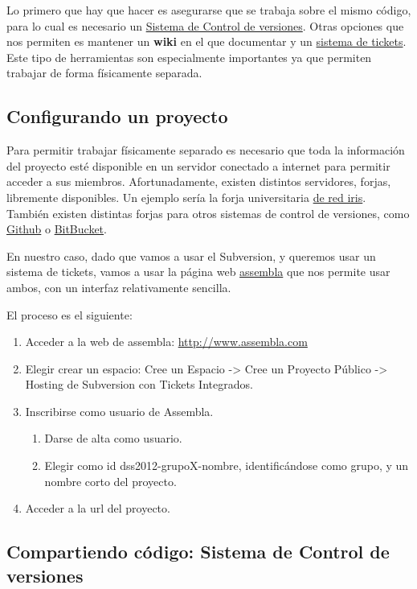 \documentclass[11pt]{article}
\begin{document}
Lo primero que hay que hacer es asegurarse que se trabaja sobre el mismo código, para lo cual es necesario
un \hyperref[sec-7-2]{Sistema de Control de versiones}. Otras opciones que nos permiten es mantener un \textbf{wiki} en el que documentar
y un \hyperref[sec-7-4]{sistema de tickets}. Este tipo de herramientas son especialmente importantes ya que permiten trabajar de forma
físicamente separada.
\subsection{Configurando un proyecto}
\label{sec-7-1}




Para permitir trabajar físicamente separado es necesario que toda la información del proyecto esté disponible en un
servidor conectado a internet para permitir acceder a sus miembros. Afortunadamente, existen distintos servidores, forjas, 
libremente disponibles. Un ejemplo sería la forja universitaria \href{http://forja.rediris.es}{de red iris}. También existen distintas forjas para otros
sistemas de control de versiones, como \href{http://github.com}{Github} o \href{http://bitbucket.org}{BitBucket}. 


En nuestro caso, dado que vamos a usar el Subversion, y queremos usar un sistema de tickets, vamos a usar la página web
\href{http://www.assembla.com}{assembla} que nos permite usar ambos, con un interfaz relativamente sencilla. 


El proceso es el siguiente:




\begin{enumerate}
\item Acceder a la web de assembla: \href{http://www.assembla.com}{http://www.assembla.com}
\item Elegir crear un espacio: Cree un Espacio -> Cree un Proyecto
   Público -> Hosting de Subversion con Tickets Integrados.
\item Inscribirse como usuario de Assembla.
\begin{enumerate}
\item Darse de alta como usuario.
\item Elegir como id dss2012-grupoX-nombre, identificándose como
      grupo, y un nombre corto del proyecto.
\end{enumerate}
\item Acceder a la url del proyecto.
\end{enumerate}
\subsection{Compartiendo código: Sistema de Control de versiones}
\label{sec-7-2}
\label{scv}
\end{document}
